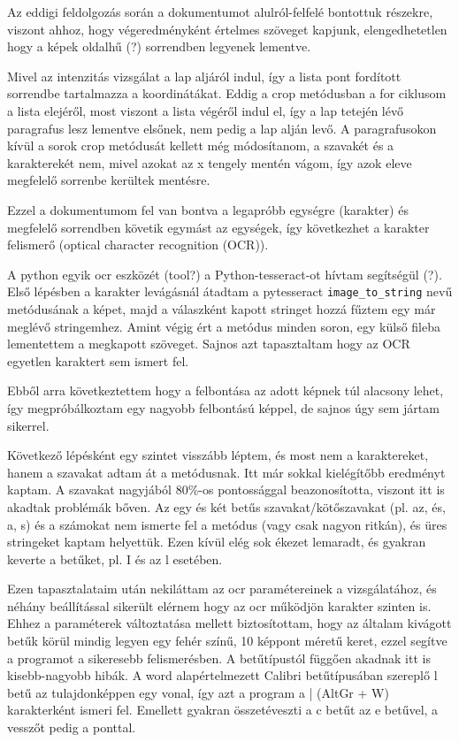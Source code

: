 Az eddigi feldolgozás során a dokumentumot alulról-felfelé bontottuk részekre, viszont ahhoz, hogy végeredményként értelmes szöveget kapjunk, elengedhetetlen hogy a képek oldalhű (?) sorrendben legyenek lementve.

Mivel az intenzitás vizsgálat a lap aljáról indul, így a lista pont fordított sorrendbe tartalmazza a koordinátákat. Eddig a crop metódusban a for ciklusom a lista elejéről, most viszont a lista végéről indul el, így a lap tetején lévő paragrafus lesz lementve elsőnek, nem pedig a lap alján levő. A paragrafusokon kívül a sorok crop metódusát kellett még módosítanom, a szavakét és a karakterekét nem, mivel azokat az x tengely mentén vágom, így azok eleve megfelelő sorrenbe kerültek mentésre.

Ezzel a dokumentumom fel van bontva a legapróbb egységre (karakter) és megfelelő sorrendben követik egymást az egységek, így következhet a karakter felismerő (optical character recognition (OCR)).


A python egyik ocr eszközét (tool?) a Python-tesseract-ot hívtam segítségül (?). Első lépésben a karakter levágásnál átadtam a pytesseract \texttt{image\_to\_string} nevű metódusának a képet, majd a válaszként kapott stringet hozzá fűztem egy már meglévő stringemhez. Amint végig ért a metódus minden soron, egy külső fileba lementettem a megkapott szöveget. Sajnos azt tapasztaltam hogy az OCR egyetlen karaktert sem ismert fel.

Ebből arra következtettem hogy a felbontása az adott képnek túl alacsony lehet, így megpróbálkoztam egy nagyobb felbontású képpel, de sajnos úgy sem jártam sikerrel.

Következő lépésként egy szintet visszább léptem, és most nem a karaktereket, hanem a szavakat adtam át a metódusnak. Itt már sokkal kielégítőbb eredményt kaptam. A szavakat nagyjából 80\%-os pontossággal beazonosította, viszont itt is akadtak problémák bőven. Az egy és két betűs szavakat/kötőszavakat (pl. az, és, a, s) és a számokat nem ismerte fel a metódus (vagy csak nagyon ritkán), és üres stringeket kaptam helyettük. Ezen kívül elég sok ékezet lemaradt, és gyakran keverte a betűket, pl. I és az l esetében.

Ezen tapasztalataim után nekiláttam az ocr paramétereinek a vizsgálatához, és néhány beállítással sikerült elérnem hogy az ocr működjön karakter szinten is. Ehhez a paraméterek változtatása mellett biztosítottam, hogy az általam kivágott betűk körül mindig legyen egy fehér színű, 10 képpont méretű keret, ezzel segítve a programot a sikeresebb felismerésben. A betűtípustól függően akadnak itt is kisebb-nagyobb hibák. A word alapértelmezett Calibri betűtípusában szereplő l betű az tulajdonképpen egy vonal, így azt a program a | (AltGr + W) karakterként ismeri fel. Emellett gyakran összetéveszti a c betűt az e betűvel, a vesszőt pedig a ponttal.

